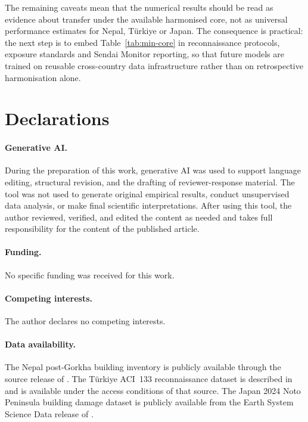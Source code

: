 \documentclass[11pt,a4paper]{article}
\begin{document}
The remaining caveats mean that the numerical results should be read as evidence about transfer under the available harmonised core, not as universal performance estimates for Nepal, T\"urkiye or Japan. The consequence is practical: the next step is to embed Table~\ref{tab:min-core} in reconnaissance protocols, exposure standards and Sendai Monitor reporting, so that future models are trained on reusable cross-country data infrastructure rather than on retrospective harmonisation alone.

\section*{Declarations}

\paragraph{Generative AI.}

During the preparation of this work, generative AI was used to support language editing, structural revision, and the drafting of reviewer-response material. The tool was not used to generate original empirical results, conduct unsupervised data analysis, or make final scientific interpretations. After using this tool, the author reviewed, verified, and edited the content as needed and takes full responsibility for the content of the published article.

\paragraph{Funding.} No specific funding was received for this
work.

\paragraph{Competing interests.} The author declares no competing
interests.


\paragraph{Data availability.} The Nepal post-Gorkha building
inventory is publicly available through the source release of
\citet{ghimire2022nepal}. The T\"urkiye ACI~133 reconnaissance
dataset is described in \citet{hariri2025turkiye} and is available
under the access conditions of that source. The Japan 2024 Noto
Peninsula building damage dataset is publicly available from the
Earth System Science Data release of \citet{vescovo2025noto}.
\end{document}
